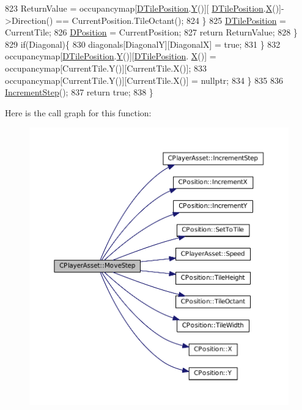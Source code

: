 \begin{DoxyCode}
823                 ReturnValue = occupancymap[\hyperlink{classCPlayerAsset_a5b59a9d3b7db8c7fa194b80dafb96186}{DTilePosition}.\hyperlink{classCPosition_a1aa8a30e2f08dda1f797736ba8c13a87}{Y}()][
      \hyperlink{classCPlayerAsset_a5b59a9d3b7db8c7fa194b80dafb96186}{DTilePosition}.\hyperlink{classCPosition_a9a6b94d3b91df1492d166d9964c865fc}{X}()]->Direction() == CurrentPosition.TileOctant();
824             \}
825             \hyperlink{classCPlayerAsset_a5b59a9d3b7db8c7fa194b80dafb96186}{DTilePosition} = CurrentTile;
826             \hyperlink{classCPlayerAsset_aa9f53c009b181c7c5647c6b03776a04c}{DPosition} = CurrentPosition;
827             \textcolor{keywordflow}{return} ReturnValue;
828         \}
829         \textcolor{keywordflow}{if}(Diagonal)\{
830             diagonals[DiagonalY][DiagonalX] = \textcolor{keyword}{true};
831         \}
832         occupancymap[\hyperlink{classCPlayerAsset_a5b59a9d3b7db8c7fa194b80dafb96186}{DTilePosition}.\hyperlink{classCPosition_a1aa8a30e2f08dda1f797736ba8c13a87}{Y}()][\hyperlink{classCPlayerAsset_a5b59a9d3b7db8c7fa194b80dafb96186}{DTilePosition}.
      \hyperlink{classCPosition_a9a6b94d3b91df1492d166d9964c865fc}{X}()] = occupancymap[CurrentTile.Y()][CurrentTile.X()];
833         occupancymap[CurrentTile.Y()][CurrentTile.X()] = \textcolor{keyword}{nullptr};
834     \}
835     
836     \hyperlink{classCPlayerAsset_aa1d39b408fd5aa11f2c3a19ef4d3895d}{IncrementStep}();
837     \textcolor{keywordflow}{return} \textcolor{keyword}{true};
838 \}
\end{DoxyCode}
Here is the call graph for this function\+:\nopagebreak
\begin{figure}[H]
\begin{center}
\leavevmode
\includegraphics[width=350pt]{classCPlayerAsset_a4c8ef6c0049b48045c2ba95d398dbc05_cgraph}
\end{center}
\end{figure}
